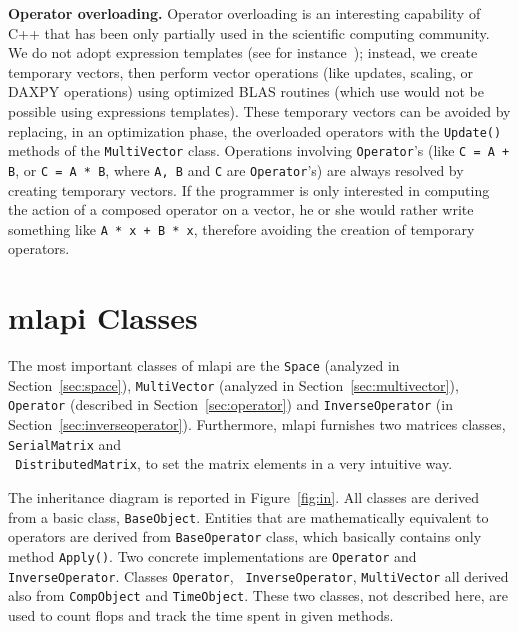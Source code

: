 \documentclass{article}[11pt]
\newcommand{\MLAPI}  {{\sc mlapi }}
\begin{document}
\noindent
{\bf Operator overloading.} Operator overloading is an 
interesting capability of C++ that has been only
partially used in the scientific computing community. We do not adopt expression
templates (see for instance~\cite{vandevoorde03cpp}); instead, we
create temporary vectors, then perform vector operations (like updates,
scaling, or DAXPY operations) using optimized BLAS routines 
(which use would not be possible using expressions templates). These temporary vectors
can be avoided by replacing, in an optimization phase, the overloaded
operators with the {\tt Update()} methods of the {\tt MultiVector} class.
Operations involving {\tt Operator}'s (like {\tt C = A + B}, or {\tt C = A *
B}, where {\tt A, B} and {\tt C} are {\tt Operator}'s) are always resolved by creating
temporary vectors. If the programmer is only interested in computing the
action of a composed operator on a vector, he or she would rather write
something like {\tt A * x + B * x}, therefore avoiding the creation of
temporary operators. 

\section{\MLAPI Classes}
\label{sec:basic}

The most important classes of \MLAPI are the {\tt Space} 
(analyzed in Section~\ref{sec:space}), {\tt MultiVector}
(analyzed in Section~\ref{sec:multivector}),
{\tt Operator} (described in Section~\ref{sec:operator}) and 
{\tt InverseOperator} (in Section~\ref{sec:inverseoperator}). Furthermore,
\MLAPI furnishes two matrices classes, {\tt SerialMatrix} and \\
{\tt
  DistributedMatrix}, to set the matrix elements in a very intuitive 
  way.

The inheritance diagram is reported in Figure~\ref{fig:in}. All classes are
derived from a basic class, {\tt BaseObject}. Entities that are mathematically
equivalent to operators are derived from {\tt BaseOperator} class, which
basically contains only method {\tt Apply()}. Two concrete implementations are
{\tt Operator} and {\tt InverseOperator}.  Classes {\tt Operator}, {\tt
  InverseOperator}, {\tt MultiVector} all derived also from {\tt CompObject}
  and {\tt TimeObject}. These two classes, not  described here, are used to
  count flops and track the time spent in given methods. 
\end{document}
